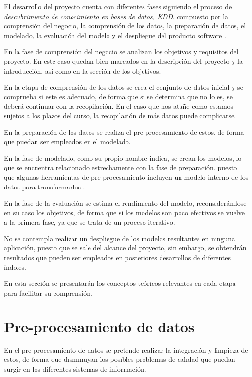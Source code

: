 El desarrollo del proyecto cuenta con diferentes fases siguiendo el proceso de \textit{descubrimiento de conocimiento
en bases de datos, KDD}, compuesto por la comprensión del negocio, la comprensión de los datos, la preparación de datos,
el modelado, la evaluación del modelo y el despliegue del producto software \cite{book:witten2017}.


En la fase de comprensión del negocio se analizan los objetivos y requisitos del proyecto. 
En este caso quedan bien marcados en la descripción del proyecto y la introducción, así como en la sección de los objetivos.

En la etapa de comprensión de los datos se crea el conjunto de datos inicial y se comprueba si este es adecuado,
de forma que si se determina que no lo es, se deberá continuar con la recopilación.
En el caso que nos atañe como estamos sujetos a los plazos del curso, la recopilación de más datos puede complicarse.

En la preparación de los datos se realiza el pre-procesamiento de estos, de forma que puedan ser empleados en el modelado.

En la fase de modelado, como su propio nombre indica, se crean los modelos, lo que se encuentra relacionado estrechamente con
la fase de preparación, puesto que algunas herramientas de pre-procesamiento incluyen un modelo interno 
de los datos para transformarlos \cite{book:witten2017}.

En la fase de la evaluación se estima el rendimiento del modelo, reconsiderándose en su caso los objetivos, de forma 
que si los modelos son poco efectivos se vuelve a la primera fase, ya que se trata de
un proceso iterativo.

No se contempla realizar un despliegue de los modelos resultantes en ninguna aplicación, puesto que se sale del alcance del proyecto,
sin embargo, se obtendrán resultados que pueden ser empleados en posteriores desarrollos de diferentes
índoles.

En esta sección se presentarán los conceptos teóricos relevantes en cada etapa para facilitar su comprensión.

\section{Pre-procesamiento de datos}
En el pre-procesamiento de datos se pretende realizar la integración y limpieza de estos, de forma que disminuyan los posibles problemas
de calidad que puedan surgir en los diferentes sistemas de información.

